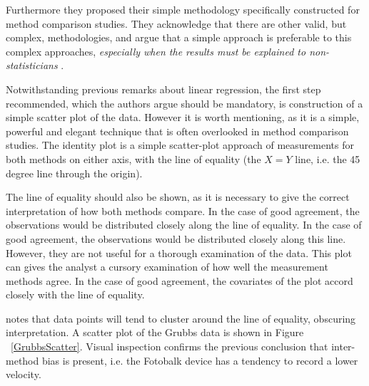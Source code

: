 \documentclass[12pt, a4paper]{report}
\theoremstyle{plain}
\theoremstyle{definition}
\theoremstyle{remark}
\begin{document}
Furthermore they proposed their simple methodology specifically constructed for method comparison studies. They acknowledge that there are other valid, but complex, methodologies, and argue that
		a simple approach is preferable to this complex approaches,
		\emph{especially when the results must be explained to
			non-statisticians} \citep*{BA83}.
		
Notwithstanding previous remarks about linear regression, the first step recommended, which the authors argue should be mandatory, is construction of a simple scatter plot of the data. However it is worth mentioning, as it is a simple, powerful and elegant technique that is often overlooked in method comparison studies. The identity plot is a simple scatter-plot approach of measurements for both methods on either axis, with the line of equality (the $X=Y$ line, i.e. the 45 degree line through the origin). 
			
The line of equality should also be shown, as it is necessary to give the correct interpretation of how both methods compare. In the case of good agreement, the observations would be distributed closely along the line of equality. In the case of good agreement, the observations would be distributed closely along this line. However, they are not useful for a thorough examination of the data.
This plot can gives the analyst a cursory examination of how well the measurement methods agree. In the case of good agreement, the covariates of the plot accord closely with the line of equality.

\citet{BritHypSoc} notes that data points will tend to cluster around the line of equality, obscuring interpretation. A scatter plot of the Grubbs data is shown in Figure ~\ref{GrubbsScatter}. Visual inspection confirms the previous conclusion that inter-method bias is present, i.e. the Fotobalk device has a tendency to record a lower velocity.
	
\end{document}

